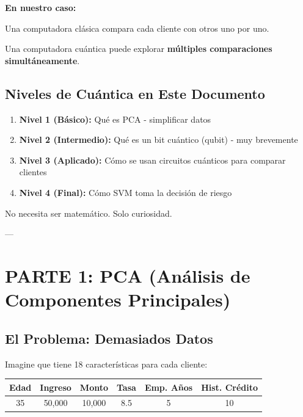 \documentclass[11pt,a4paper,spanish]{article}
\begin{document}
\textbf{En nuestro caso:}

Una computadora clásica compara cada cliente con otros uno por uno.

Una computadora cuántica puede explorar \textbf{múltiples comparaciones simultáneamente}.

\subsection{Niveles de Cuántica en Este Documento}

\begin{enumerate}
    \item \textbf{Nivel 1 (Básico):} Qué es PCA - simplificar datos
    \item \textbf{Nivel 2 (Intermedio):} Qué es un bit cuántico (qubit) - muy brevemente
    \item \textbf{Nivel 3 (Aplicado):} Cómo se usan circuitos cuánticos para comparar clientes
    \item \textbf{Nivel 4 (Final):} Cómo SVM toma la decisión de riesgo
\end{enumerate}

No necesita ser matemático. Solo curiosidad.

---

\section{PARTE 1: PCA (Análisis de Componentes Principales)}

\subsection{El Problema: Demasiados Datos}

Imagine que tiene 18 características para cada cliente:

\begin{table}[H]
\centering
\small
\begin{tabular}{|c|c|c|c|c|c|}
\hline
\textbf{Edad} & \textbf{Ingreso} & \textbf{Monto} & \textbf{Tasa} & \textbf{Emp. Años} & \textbf{Hist. Crédito} \\
\hline
35 & 50,000 & 10,000 & 8.5 & 5 & 10 \\
\hline
\end{tabular}
\end{table}
\end{document}
